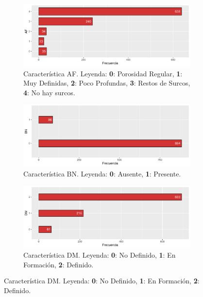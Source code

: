 \begin{figure}[p]
    \centering
    \begin{subfigure}{\textwidth}
        \includegraphics[width=\linewidth]{../../scripts/eda/eda_univar/char_af_distr.pdf}
        \caption{Característica AF. Leyenda: \textbf{0}: Porosidad Regular, \textbf{1}: Muy Definidas, \textbf{2}: Poco Profundas, \textbf{3}: Restos de Surcos, \textbf{4}: No hay surcos.}
        \label{fig4:todd_chars__af}
    \end{subfigure}

    \begin{subfigure}{\textwidth}
        \includegraphics[width=\linewidth]{../../scripts/eda/eda_univar/char_bn_distr.pdf}
        \caption{Característica BN. Leyenda: \textbf{0}: Ausente, \textbf{1}: Presente.}
        \label{fig4:todd_chars__bn}
    \end{subfigure}
    
    \begin{subfigure}{\textwidth}
        \includegraphics[width=\linewidth]{../../scripts/eda/eda_univar/char_dm_distr.pdf}
        \caption{Característica DM. Leyenda: \textbf{0}: No Definido, \textbf{1}: En Formación, \textbf{2}: Definido.}
        \label{fig4:todd_chars__dm}
    \end{subfigure}

\end{figure}
